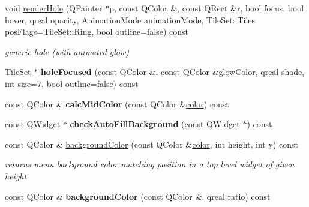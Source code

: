 \begin{DoxyCompactItemize}
\mbox{\label{class_style_helper_a25005744d711202ae38559edebb79823}} 
void \hyperlink{class_style_helper_a25005744d711202ae38559edebb79823}{render\+Hole} (Q\+Painter $\ast$p, const Q\+Color \&, const Q\+Rect \&r, bool focus, bool hover, qreal opacity, Animation\+Mode animation\+Mode, Tile\+Set\+::\+Tiles pos\+Flags=Tile\+Set\+::\+Ring, bool outline=false) const
\begin{DoxyCompactList}\small\item\em generic hole (with animated glow) \end{DoxyCompactList}\item 
\mbox{\label{class_style_helper_af75130eb7dc26d5590880898412a1bff}} 
\hyperlink{class_tile_set}{Tile\+Set} $\ast$ {\bfseries hole\+Focused} (const Q\+Color \&, const Q\+Color \&glow\+Color, qreal shade, int size=7, bool outline=false) const
\item 
\mbox{\label{class_style_helper_aff4f9c3e7066b87a6cc255a17eef00dc}} 
const Q\+Color \& {\bfseries calc\+Mid\+Color} (const Q\+Color \&\hyperlink{structcolor}{color}) const
\item 
\mbox{\label{class_style_helper_a3a25bc048939e2a191ec01221c6d7416}} 
const Q\+Widget $\ast$ {\bfseries check\+Auto\+Fill\+Background} (const Q\+Widget $\ast$) const
\item 
\mbox{\label{class_style_helper_aad398bae1f73d9f5adfd64782acbf3c6}} 
const Q\+Color \& \hyperlink{class_style_helper_aad398bae1f73d9f5adfd64782acbf3c6}{background\+Color} (const Q\+Color \&\hyperlink{structcolor}{color}, int height, int y) const
\begin{DoxyCompactList}\small\item\em returns menu background color matching position in a top level widget of given height \end{DoxyCompactList}\item 
\mbox{\label{class_style_helper_aa5bd005077339a314cccbc830d5665e6}} 
const Q\+Color \& {\bfseries background\+Color} (const Q\+Color \&, qreal ratio) const
\item 
\mbox{\label{class_style_helper_af2fc9486774e8b4be5a1f14a3dc32458}} 

\end{DoxyCompactItemize}
